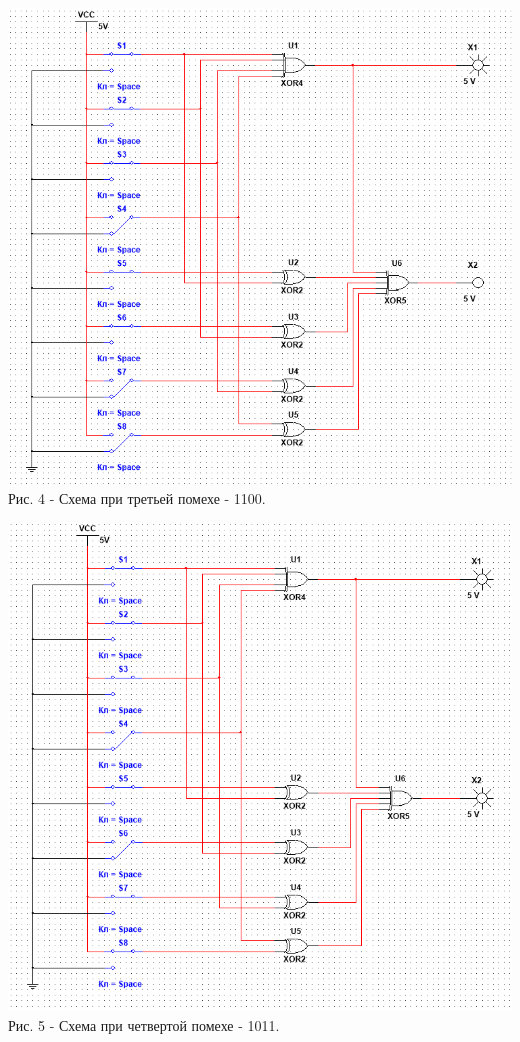 \documentclass[11pt]{article}
\begin{document}
\begin{center}
    \includegraphics[width=1\linewidth]{img/pomeha3.png}
    Рис. 4 - Схема при третьей помехе - 1100.
\end{center}

\begin{center}
    \includegraphics[width=1\linewidth]{img/pomeha4.png}
    Рис. 5 - Схема при четвертой помехе - 1011.
\end{center}
\end{document}
